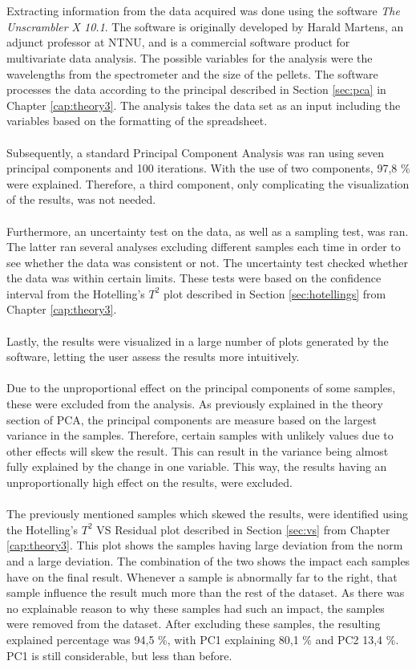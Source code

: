 \\\\
\noindent
Extracting information from the data acquired was done using the software \textit{The Unscrambler X 10.1}. The software is originally developed by Harald Martens, an adjunct professor at NTNU, and is a commercial software product for multivariate data analysis. The possible variables for the analysis were the wavelengths from the spectrometer and the size of the pellets. The software processes the data according to the principal described in Section \ref{sec:pca} in Chapter \ref{cap:theory3}. The analysis takes the data set as an input including the variables based on the formatting of the spreadsheet. 
\\\\
Subsequently, a standard Principal Component Analysis was ran using seven principal components and 100 iterations. With the use of two components, 97,8 \% were explained. Therefore, a third component, only complicating the visualization of the results, was not needed.
\\\\
Furthermore, an uncertainty test on the data, as well as a sampling test, was ran. The latter ran several analyses excluding different samples each time in order to see whether the data was consistent or not. The uncertainty test checked whether the data was within certain limits. These tests were based on the confidence interval from the Hotelling's $T^2$ plot described in Section \ref{sec:hotellings} from Chapter \ref{cap:theory3}. 
\\\\
Lastly, the results were visualized in a large number of plots generated by the software, letting the user assess the results more intuitively. 
\\\\
Due to the unproportional effect on the principal components of some samples, these were excluded from the analysis. As previously explained in the theory section of PCA, the principal components are measure based on the largest variance in the samples. Therefore, certain samples with unlikely values due to other effects will skew the result. This can result in the variance being almost fully explained by the change in one variable. This way, the results having an unproportionally high effect on the results, were excluded.
\\\\%
The previously mentioned samples which skewed the results, were identified using the Hotelling's $T^2$ VS Residual plot described in Section \ref{sec:vs} from Chapter \ref{cap:theory3}. This plot shows the samples having large deviation from the norm and a large deviation. The combination of the two shows the impact each samples have on the final result. Whenever a sample is abnormally far to the right, that sample influence the result much more than the rest of the dataset. As there was no explainable reason to why these samples had such an impact, the samples were removed from the dataset. After excluding these samples, the resulting explained percentage was 94,5 \%, with PC1 explaining 80,1 \% and PC2 13,4 \%. PC1 is still considerable, but less than before.
